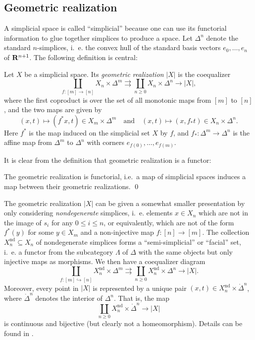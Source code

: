 \documentclass[a4paper,openany]{scrbook}
\begin{document}
\subsection{Geometric realization}

A simplicial space is called “simplicial” because one can use its functorial information to glue together simplices to produce a space. Let $\Delta^n$ denote the standard $n$-simplices, i.~e. the convex hull of the standard basis vectors $e_0,\dots,e_n$ of $\mathbf R^{n+1}$. The following definition is central:

\begin{defn}
Let $X$ be a simplicial space. Its \emph{geometric realization} $|X|$ is the coequalizer
\[
\coprod_{f\colon [m] \to [n]} X_n \times \Delta^m \rightrightarrows \coprod_{n \geq 0} X_n \times \Delta^n \to |X|,
\]
where the first coproduct is over the set of all monotonic maps from $[m]$ to $[n]$, and the two maps are given by
\[
(x,t) \mapsto (f^*x,t) \in X_m \times \Delta^m \quad \text{and} \quad (x,t) \mapsto (x,f_*t) \in X_n \times \Delta^n.
\]
Here $f^*$ is the map induced on the simplicial set $X$ by $f$, and $f_*\colon \Delta^m \to \Delta^n$ is the affine map from $\Delta^m$ to $\Delta^n$ with corners $e_{f(0)},\dots,e_{f(m)}$.
\end{defn}

It is clear from the definition that geometric realization is a functor:

\begin{lemma}
The geometric realization is functorial, i.e.\ a map of simplicial spaces induces a map between their geometric realizations. \qed
\end{lemma}

The geometric realization $|X|$ can be given a somewhat smaller presentation by only considering \emph{nondegenerate} simplices, i.~e. elements $x \in X_n$ which are not in the image of $s_i$ for any $0 \leq i \leq n$, or equivalently, which are not of the form $f^*(y)$ for some $y \in X_m$ and a non-injective map $f\colon [n] \to [m]$. The collection $X^{\operatorname{nd}}_n \subseteq X_n$ of nondegenerate simplices forms a ``semi-simplicial'' or ``facial'' set, i.~e. a functor from the subcategory $\Lambda$ of $\Delta$ with the same objects but only injective maps as morphisms. We then have a coequalizer diagram
\begin{equation}\label{eq:realizationwithnondegenerates}
\coprod_{f\colon [m] \hookrightarrow [n]} X^{\operatorname{nd}}_n \times \Delta^m \rightrightarrows \coprod_{n \geq 0} X^{\operatorname{nd}}_n \times \Delta^n \to |X|.
\end{equation}
Moreover, every point in $|X|$ is represented by a unique pair $(x,t) \in X^{\operatorname{nd}}_n \times \mathring\Delta^n$, where $\mathring\Delta^n$ denotes the interior of $\Delta^n$. That is, the map
\[
\coprod_{n \geq 0} X^{\operatorname{nd}}_n \times \mathring \Delta^n \to |X|
\]
is continuous and bijective (but clearly not a homeomorphism). Details can be found in \cite{milnor:57}.
\end{document}
